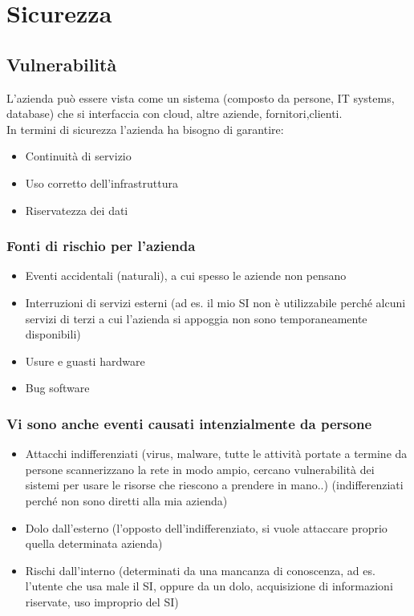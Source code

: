 \chapter{Sicurezza}

\section{Vulnerabilit\`a}

L'azienda pu\`o essere vista come un sistema (composto da persone, IT
systems, database) che si interfaccia con cloud, altre aziende, fornitori,clienti.\\
In termini di sicurezza l'azienda ha bisogno di garantire:

\begin{itemize}

\item
  Continuit\`a di servizio
\item
  Uso corretto dell'infrastruttura
\item
  Riservatezza dei dati
\end{itemize}

\subsection{Fonti di rischio per l'azienda}

\begin{itemize}

\item
  Eventi accidentali (naturali), a cui spesso le aziende non pensano
\item
  Interruzioni di servizi esterni (ad es. il mio SI non \`e utilizzabile
  perch\'e alcuni servizi di terzi a cui l'azienda si appoggia non sono
  temporaneamente disponibili)
\item
  Usure e guasti hardware
\item
  Bug software
\end{itemize}

\subsection{Vi sono anche eventi causati intenzialmente da persone}

\begin{itemize}

\item
  Attacchi indifferenziati (virus, malware, tutte le attivit\`a portate a
  termine da persone scannerizzano la rete in modo ampio, cercano
  vulnerabilit\`a dei sistemi per usare le risorse che riescono a prendere
  in mano..) (indifferenziati perch\'e non sono diretti alla mia azienda)
\item
  Dolo dall'esterno (l'opposto dell'indifferenziato, si vuole attaccare
  proprio quella determinata azienda)
\item
  Rischi dall'interno (determinati da una mancanza di conoscenza, ad es.
  l'utente che usa male il SI, oppure da un dolo, acquisizione di
  informazioni riservate, uso improprio del SI)
\end{itemize}

